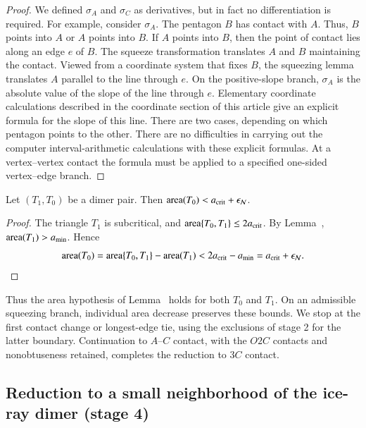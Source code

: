 \begin{proof}
We defined $\sigma_A$ and $\sigma_C$ as derivatives, but in fact no
differentiation is required.  For example, consider $\sigma_A$.  The
pentagon $B$ has contact with $A$.  Thus, $B$ points into $A$ or $A$
points into $B$.  If $A$ points into $B$, then the point of contact
lies along an edge $e$ of $B$.  The squeeze transformation translates
$A$ and $B$ maintaining the contact.  Viewed from a coordinate system
that fixes $B$, the squeezing lemma translates $A$ parallel to the
line through $e$.  On the positive-slope branch, $\sigma_A$ is the absolute value of
the slope of the line through $e$.  Elementary coordinate calculations
described in the coordinate section of this article give an explicit
formula for the slope of this line.  There are two cases, depending on
which pentagon points to the other.  There are no difficulties in
carrying out the computer interval-arithmetic calculations with these explicit formulas.
At a vertex--vertex contact the formula must be applied to a
specified one-sided vertex--edge branch.
\end{proof}

\begin{lemma}
  Let $(T_1,T_0)$ be a dimer pair.
  Then ${\operatorname{area}}(T_0) < a_\text{crit}+\epsilon_{\mathcal N}$.
\end{lemma}

\begin{proof}
The triangle $T_1$ is subcritical, and
${\operatorname{area}}\{T_0,T_1\}\le2a_\text{crit}$.  By Lemma~,
${\operatorname{area}}(T_1)>a_\text{min}$.  Hence
\begin{equation}\libel{eq:dimer-acrit-epsN}
\area(T_0) = \area\{T_0,T_1\} - \area(T_1) 
< 2\acrit - \ao = \acrit+\epsN.
\end{equation}
\end{proof}

Thus the area hypothesis of Lemma~ holds
for both $T_0$ and $T_1$.  On an admissible squeezing branch,
individual area decrease preserves these bounds.  We stop at the
first contact change or longest-edge tie, using the exclusions of
stage 2 for the latter boundary.  Continuation to $A$--$C$
contact, with the $O2C$ contacts and nonobtuseness retained,
completes the reduction to $3C$ contact.

\subsection{Reduction to a small neighborhood of the ice-ray
  dimer (stage 4)}

